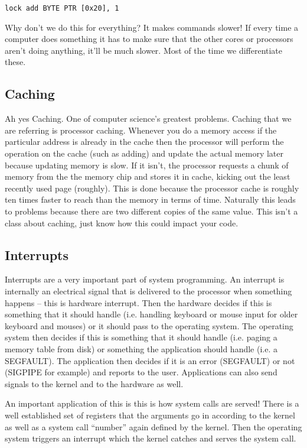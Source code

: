\begin{verbatim}
lock add BYTE PTR [0x20], 1
\end{verbatim}

Why don't we do this for everything?
It makes commands slower! If every time a computer does something it has to make sure that the other cores or processors aren't doing anything, it'll be much slower.
Most of the time we differentiate these.

\subsection{Caching}

Ah yes Caching.
One of computer science's greatest problems.
Caching that we are referring is processor caching.
Whenever you do a memory access if the particular address is already in the cache then the processor will perform the operation on the cache (such as adding) and update the actual memory later because updating memory is slow.
If it isn't, the processor requests a chunk of memory from the the memory chip and stores it in cache, kicking out the least recently used page (roughly).
This is done because the processor cache is roughly ten times faster to reach than the memory in terms of time.
Naturally this leads to problems because there are two different copies of the same value.
This isn't a class about caching, just know how this could impact your code.

\subsection{Interrupts}

Interrupts are a very important part of system programming.
An interrupt is internally an electrical signal that is delivered to the processor when something happens -- this is hardware interrupt.
Then the hardware decides if this is something that it should handle (i.e. handling keyboard or mouse input for older keyboard and mouses) or it should pass to the operating system.
The operating system then decides if this is something that it should handle (i.e. paging a memory table from disk) or something the application should handle (i.e. a SEGFAULT).
The application then decides if it is an error (SEGFAULT) or not (SIGPIPE for example) and reports to the user.
Applications can also send signals to the kernel and to the hardware as well.
 
An important application of this is this is how system calls are served!
There is a well established set of registers that the arguments go in according to the kernel as well as a system call ``number'' again defined by the kernel.
Then the operating system triggers an interrupt which the kernel catches and serves the system call.

